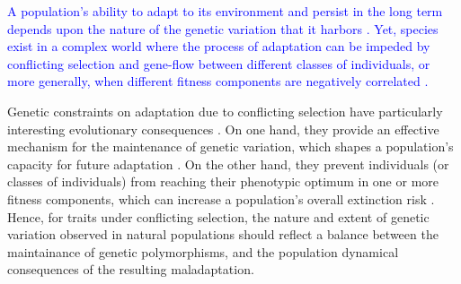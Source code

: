 \documentclass[11pt]{article}
\begin{document}
\textcolor{blue}{A population's ability to adapt to its environment and persist in the long term depends upon the nature of the genetic variation that it harbors \citep{Fisher1930, Lewontin1975}. Yet, species exist in a complex world where the process of adaptation can be impeded by conflicting selection and gene-flow between different classes of individuals, or more generally, when different fitness components are negatively correlated \citep{CharlesworthHughes2000, ConnallonHall2018}.}

Genetic constraints on adaptation due to conflicting selection have particularly interesting evolutionary consequences \citep{ConnallonDebarreLi2018}. On one hand, they provide an effective mechanism for the maintenance of genetic variation, which shapes a population's capacity for future adaptation \citep{Fisher1930, CharlesworthHughes2000, ConnallonHall2018, MatthewsConnallon2019}. On the other hand, they prevent individuals (or classes of individuals) from reaching their phenotypic optimum in one or more fitness components, which can increase a population's overall extinction risk \citep{kokko2003sexy, harts2014demography}. Hence, for traits under conflicting selection, the nature and extent of genetic variation observed in natural populations should reflect a balance between the maintainance of genetic polymorphisms, and the population dynamical consequences of the resulting maladaptation.

\end{document}
